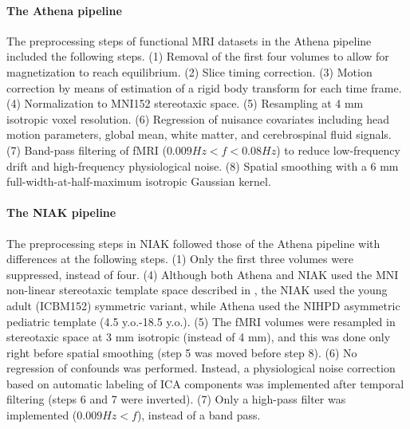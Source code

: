 \documentclass[preprint,12pt,3p]{elsarticle}
\begin{document}
\paragraph{The Athena pipeline} The preprocessing steps of functional MRI datasets in the Athena pipeline included the following steps. (1) Removal of the first four volumes to allow for magnetization to reach equilibrium. (2) Slice timing correction. (3) Motion correction by means of estimation of a rigid body transform for each time frame. (4) Normalization to MNI152 stereotaxic space. (5) Resampling at 4 mm isotropic voxel resolution. (6) Regression of nuisance covariates including head motion parameters, global mean, white matter, and cerebrospinal ﬂuid signals. (7) Band-pass filtering of fMRI ($0.009 Hz < f < 0.08 Hz$) to reduce low-frequency drift and high-frequency physiological noise. (8) Spatial smoothing with a 6 mm full-width-at-half-maximum isotropic Gaussian kernel.

\paragraph{The NIAK pipeline} The preprocessing steps in NIAK followed those of the Athena pipeline with differences at the following steps. (1) Only the first three volumes were suppressed, instead of four. (4) Although both Athena and NIAK used the MNI non-linear stereotaxic template space described in \citep{fonov2011unbiased}, the NIAK used the young adult (ICBM152) symmetric variant, while Athena used the NIHPD asymmetric pediatric template (4.5 y.o.-18.5 y.o.). (5) The fMRI volumes were resampled in stereotaxic space at 3 mm isotropic (instead of 4 mm), and this was done only right before spatial smoothing (step 5 was moved before step 8). (6) No regression of confounds was performed. Instead, a physiological noise correction based on automatic labeling of ICA components was implemented \citep{perlbarg2007corsica} after temporal filtering (steps 6 and 7 were inverted). (7) Only a high-pass filter was implemented ($0.009 Hz < f$), instead of a band pass. 
\end{document}
